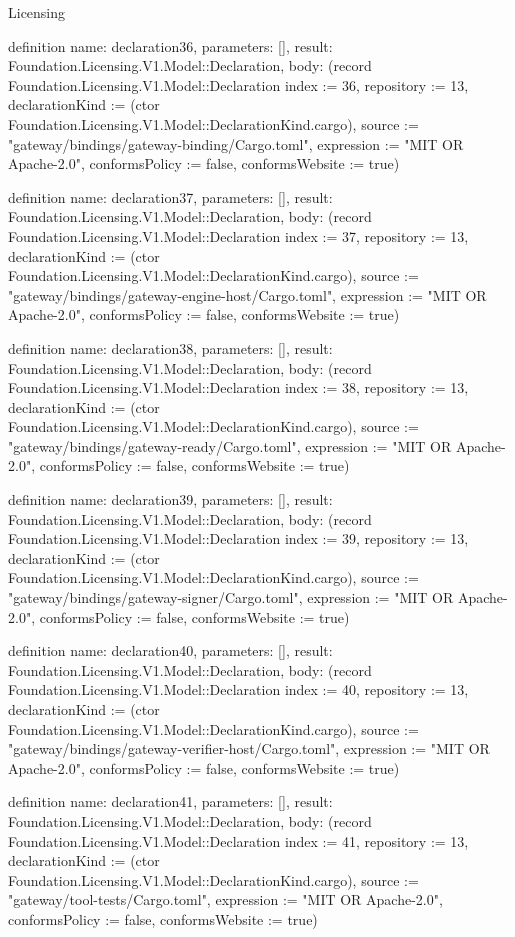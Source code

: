 \begin{lexlean}{Licensing}
\begin{semanticmodule}
definition{
  name: declaration36,
  parameters: [],
  result: Foundation.Licensing.V1.Model::Declaration,
  body: (record Foundation.Licensing.V1.Model::Declaration {index := 36, repository := 13, declarationKind := (ctor Foundation.Licensing.V1.Model::DeclarationKind.cargo), source := "gateway/bindings/gateway-binding/Cargo.toml", expression := "MIT OR Apache-2.0", conformsPolicy := false, conformsWebsite := true})
}

definition{
  name: declaration37,
  parameters: [],
  result: Foundation.Licensing.V1.Model::Declaration,
  body: (record Foundation.Licensing.V1.Model::Declaration {index := 37, repository := 13, declarationKind := (ctor Foundation.Licensing.V1.Model::DeclarationKind.cargo), source := "gateway/bindings/gateway-engine-host/Cargo.toml", expression := "MIT OR Apache-2.0", conformsPolicy := false, conformsWebsite := true})
}

definition{
  name: declaration38,
  parameters: [],
  result: Foundation.Licensing.V1.Model::Declaration,
  body: (record Foundation.Licensing.V1.Model::Declaration {index := 38, repository := 13, declarationKind := (ctor Foundation.Licensing.V1.Model::DeclarationKind.cargo), source := "gateway/bindings/gateway-ready/Cargo.toml", expression := "MIT OR Apache-2.0", conformsPolicy := false, conformsWebsite := true})
}

definition{
  name: declaration39,
  parameters: [],
  result: Foundation.Licensing.V1.Model::Declaration,
  body: (record Foundation.Licensing.V1.Model::Declaration {index := 39, repository := 13, declarationKind := (ctor Foundation.Licensing.V1.Model::DeclarationKind.cargo), source := "gateway/bindings/gateway-signer/Cargo.toml", expression := "MIT OR Apache-2.0", conformsPolicy := false, conformsWebsite := true})
}

definition{
  name: declaration40,
  parameters: [],
  result: Foundation.Licensing.V1.Model::Declaration,
  body: (record Foundation.Licensing.V1.Model::Declaration {index := 40, repository := 13, declarationKind := (ctor Foundation.Licensing.V1.Model::DeclarationKind.cargo), source := "gateway/bindings/gateway-verifier-host/Cargo.toml", expression := "MIT OR Apache-2.0", conformsPolicy := false, conformsWebsite := true})
}

definition{
  name: declaration41,
  parameters: [],
  result: Foundation.Licensing.V1.Model::Declaration,
  body: (record Foundation.Licensing.V1.Model::Declaration {index := 41, repository := 13, declarationKind := (ctor Foundation.Licensing.V1.Model::DeclarationKind.cargo), source := "gateway/tool-tests/Cargo.toml", expression := "MIT OR Apache-2.0", conformsPolicy := false, conformsWebsite := true})
}


\end{semanticmodule}
\end{lexlean}
